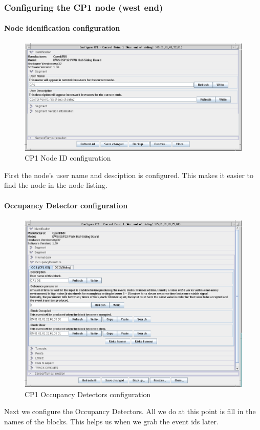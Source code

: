 \subsubsection{Configuring the CP1 node (west end)}

\paragraph{Node idenification configuration}
\begin{figure}[hbpt]\begin{centering}%
\includegraphics[width=5in]{CP1-ID-Config.png}
\caption{CP1 Node ID configuration}
\label{fig:CP1-ID-Config}
\end{centering}\end{figure}
First the node's user name and desciption is configured.  This makes it easier 
to find the node in the node listing.

\clearpage
\paragraph{Occupancy Detector configuration}
\begin{figure}[hbpt]\begin{centering}%
\includegraphics[width=5in]{CP1-OC-Config.png}
\caption{CP1 Occupancy Detectors configuration}
\label{fig:CP1-OC-Config}
\end{centering}\end{figure}
Next we configure the Occupancy Detectors.  All we do at this point is fill in 
the names of the blocks.  This helps us when we grab the event ids later.
 

